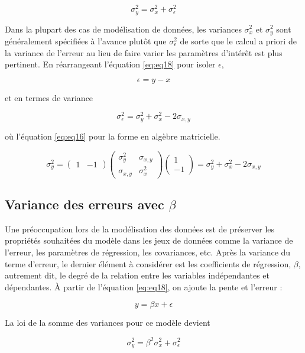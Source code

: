 \documentclass[
]{book}
\begin{document}
\[
\sigma_y^2=\sigma_x^2+\sigma_\epsilon^2
\]

Dans la plupart des cas de modélisation de données, les variances \(\sigma_x^2\) et \(\sigma_y^2\) sont généralement spécifiées à l'avance plutôt que \(\sigma_\epsilon^2\) de sorte que le calcul a priori de la variance de l'erreur au lieu de faire varier les paramètres d'intérêt est plus pertinent. En réarrangeant l'équation \eqref{eq:eq18} pour isoler \(\epsilon\),

\[
\epsilon=y-x
\]

et en termes de variance

\[
\sigma_\epsilon^2=\sigma_y^2+\sigma_x^2-2\sigma_{x,y}
\]

où l'équation \eqref{eq:eq16} pour la forme en algèbre matricielle.

\[
\sigma_y^2 = 
\left(\begin{array}{cc} 
1 & -1
\end{array}\right) 
\left( \begin{array}{cc}
\sigma^2_{y} & \sigma_{x,y} \\
\sigma_{x,y} & \sigma^2_{x} 
\end{array} 
\right)
\left(\begin{array}{c} 1 \\ -1 \end{array} \right) =
\sigma^2_y + \sigma^2_x - 2\sigma_{x,y}
\]

\hypertarget{variance-des-erreurs-avec-beta}{%
\subsection{\texorpdfstring{Variance des erreurs avec \(\beta\)}{Variance des erreurs avec \textbackslash beta}}\label{variance-des-erreurs-avec-beta}}

Une préoccupation lors de la modélisation des données est de préserver les propriétés souhaitées du modèle dans les jeux de données comme la variance de l'erreur, les paramètres de régression, les covariances, etc. Après la variance du terme d'erreur, le dernier élément à considérer est les coefficients de régression, \(\beta\), autrement dit, le degré de la relation entre les variables indépendantes et dépendantes. À partir de l'équation \eqref{eq:eq18}, on ajoute la pente et l'erreur :

\[
y=\beta x+\epsilon
\]

La loi de la somme des variances pour ce modèle devient

\begin{equation}
\sigma_y^2=\beta^2 \sigma_x^2+\sigma_\epsilon^2 
\label{eq:eq24}
\end{equation}
\end{document}
